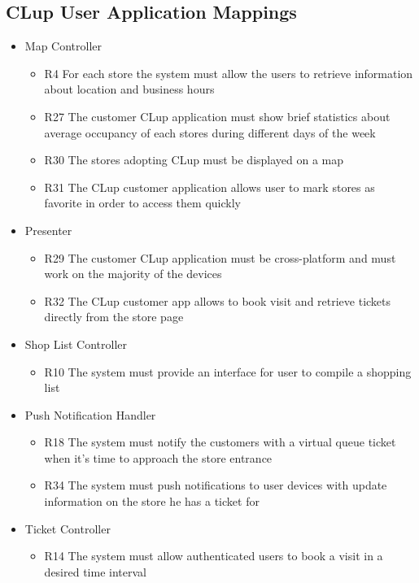\subsection{CLup User Application Mappings}
\begin{itemize}
    \item Map Controller
    \begin{itemize}
        \item R4 For each store the system must allow the users to retrieve information about location and business hours
        \item R27 The customer CLup application must show brief statistics about average occupancy of each stores during different days of the week
        \item R30 The stores adopting CLup must be displayed on a map    
        \item R31 The CLup customer application allows user to mark stores as favorite in order to access them quickly
    \end{itemize}
    \item Presenter
    \begin{itemize}
        \item R29 The customer CLup application must be cross-platform and must work on the majority of the devices
        \item R32 The CLup customer app allows to book visit and retrieve tickets directly from the store page
    \end{itemize}
    \item Shop List Controller
    \begin{itemize}
        \item R10 The system must provide an interface for user to compile a shopping list
    \end{itemize}
    \item Push Notification Handler
    \begin{itemize}
        \item R18 The system must notify the customers with a virtual queue ticket when it’s time to approach the store entrance
        \item R34 The system must push notifications to user devices with update information on the store he has a ticket for 
    \end{itemize}
    \item Ticket Controller
    \begin{itemize}
        \item R14 The system must allow authenticated users to book a visit in a desired time interval

\end{itemize}
\end{itemize}
